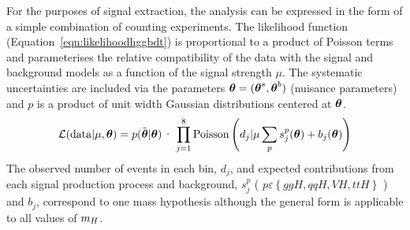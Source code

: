 For the purposes of signal extraction, the analysis can be expressed in the form of a simple
combination of counting experiments. The 
likelihood function (Equation~\ref{eqn:likelihoodhggbdt}) is proportional to a product of Poisson terms
and parameterises the relative compatibility of the data with the signal and background models 
as a function of the signal strength $\mu$.
The systematic uncertainties are included via the parameters 
${{\boldsymbol{\theta}}}=({{\boldsymbol{\theta}}}^{s},{\boldsymbol{\theta}}^{b})$ (nuisance parameters) and $p$ is a product of unit 
width Gaussian distributions centered at ${\boldsymbol{\theta}}$.
\begin{equation}
\mathcal{L} ( \mathrm{data} | \mu,\boldth ) = 
p(\boldthmeas|{\boldth})
\cdot \prod_{j=1}^{8} \mathrm{Poisson}\left( d_{j} | \mu \sum_{p}s^{p}_{j}(\boldth) + b_{j}(\boldth) \right )
\label{eqn:likelihoodhggbdt}
\end{equation}
The observed number of events in each bin, $d_{j}$, 
and expected contributions from each signal production process  and
background, $s^{p}_{j}$ ( $p \varepsilon \left\{ ggH,qqH,VH,ttH \right\}$ ) and $b_{j}$, 
correspond to one mass hypothesis
although the general form is applicable to all values of $m_{H}$.

